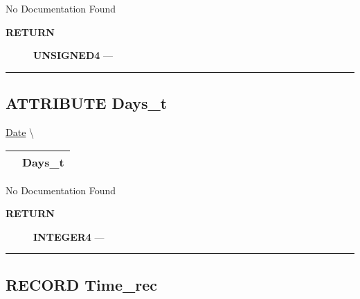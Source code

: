 \par





No Documentation Found








\par
\begin{description}
\item [\colorbox{tagtype}{\color{white} \textbf{\textsf{RETURN}}}] \textbf{UNSIGNED4} --- 
\end{description}




\rule{\linewidth}{0.5pt}
\subsection*{\textsf{\colorbox{headtoc}{\color{white} ATTRIBUTE}
Days\_t}}

\hypertarget{ecldoc:date.days_t}{}
\hspace{0pt} \hyperlink{ecldoc:Date}{Date} \textbackslash 

{\renewcommand{\arraystretch}{1.5}
\begin{tabularx}{\textwidth}{|>{\raggedright\arraybackslash}l|X|}
\hline
\hspace{0pt}\mytexttt{\color{red} } & \textbf{Days\_t} \\
\hline
\end{tabularx}
}

\par





No Documentation Found








\par
\begin{description}
\item [\colorbox{tagtype}{\color{white} \textbf{\textsf{RETURN}}}] \textbf{INTEGER4} --- 
\end{description}




\rule{\linewidth}{0.5pt}
\subsection*{\textsf{\colorbox{headtoc}{\color{white} RECORD}
Time\_rec}}

